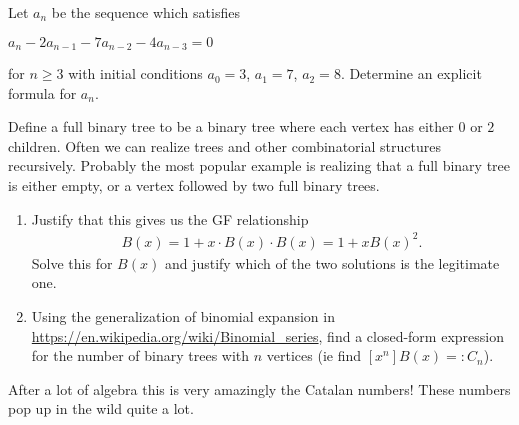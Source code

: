 \begin{enumerate}
        
      Let ${a_n}$ be the sequence which satisfies
    
        \begin{center}
            $a_n - 2a_{n-1} - 7a_{n-2} - 4a_{n-3} = 0$
        \end{center}

        for $n \ge 3$ with initial conditions $a_0 = 3$, $a_1 = 7$, $a_2 = 8$. Determine an explicit formula for $a_n$. 



    Define a full binary tree to be a binary tree where each vertex has either $0$ or $2$ children. Often we can realize trees and other combinatorial structures recursively. Probably the most popular example is realizing that a full binary tree is either empty, or a vertex followed by two full binary trees.
    \begin{enumerate}
        \item Justify that this gives us the GF relationship
        \begin{align*}
            B(x) = 1 + x \cdot B(x) \cdot B(x) = 1 + xB(x)^2.
        \end{align*}
        Solve this for $B(x)$ and justify which of the two solutions is the legitimate one.
        \item Using the generalization of binomial expansion in \url{https://en.wikipedia.org/wiki/Binomial_series}, find a closed-form expression for the number of binary trees with $n$ vertices (ie find $[x^n]B(x) =: C_n$).
    \end{enumerate}
    After a lot of algebra this is very amazingly the Catalan numbers! These numbers pop up in the wild quite a lot.
    
\end{enumerate}